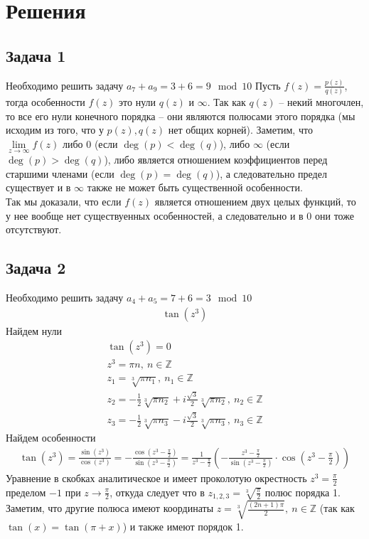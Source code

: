 
\newpage
\section*{Решения}
\subsection*{Задача 1}
	Необходимо решить задачу $a_7 + a_9 = 3 + 6 = 9 \mod 10$
	Пусть $f(z) = \frac{p(z)}{q(z)}$, тогда особенности $f(z)$ это нули $q(z)$ и $\infty$. Так как $q(z)$ -- некий многочлен, то все его нули конечного порядка -- они являются полюсами этого порядка (мы исходим из того, что у $p(z), q(z)$ нет общих корней). Заметим, что $\lim\limits_{z \to \infty} f(z)$ либо $0$ (если $\deg(p) < \deg(q)$), либо $\infty$ (если $\deg(p) > \deg(q)$), либо является отношением коэффициентов перед старшими членами (если $\deg(p) = \deg(q)$), а следовательно предел существует и в $\infty$ также не может быть существенной особенности.\\
	Так мы доказали, что если $f(z)$ является отношением двух целых функций, то у нее вообще нет существуенных особенностей, а следовательно и в 0 они тоже отсутствуют. 
\vskip 0.4in

\subsection*{Задача 2}
	Необходимо решить задачу $a_4 + a_5 = 7 + 6 = 3 \mod 10$
	\begin{gather*}
		\tan(z^3)
	\end{gather*}
	Найдем нули
	\begin{gather*}
		\tan(z^3) = 0\\
		z^3 = \pi n,\ n \in \mathbb{Z}\\
		z_1 = \sqrt[3]{\pi n_1},\ n_1 \in \mathbb{Z}\\
		z_2 = -\frac{1}{2}\sqrt[3]{\pi n_2} + i \frac{\sqrt{3}}{2} \sqrt[3]{\pi n_2},\ n_2 \in \mathbb{Z}\\
		z_3 = -\frac{1}{2}\sqrt[3]{\pi n_3} - i \frac{\sqrt{3}}{2} \sqrt[3]{\pi n_3},\ n_3 \in \mathbb{Z}
	\end{gather*}
	Найдем особенности
	\begin{gather*}
		\tan(z^3)
		= \frac{\sin(z^3)}{\cos(z^3)}
		= - \frac{\cos(z^3 - \frac{\pi}{2})}{\sin(z^3 - \frac{\pi}{2})}
		= \frac{1}{z^3 - \frac{\pi}{2}} \left(-\frac{z^3 - \frac{\pi}{2}}{\sin(z^3 - \frac{\pi}{2})} \cdot \cos(z^3 - \frac{\pi}{2}) \right)
	\end{gather*}
	Уравнение в скобках аналитическое и имеет проколотую окрестность $z^3 = \frac{\pi}{2}$  пределом $-1$ при $z \to \frac{\pi}{2}$, откуда следует что в $z_{1,2,3} = \sqrt[3]{\frac{\pi}{2}}$ полюс порядка 1. Заметим, что другие полюса имеют координаты $z = \sqrt[3]{\frac{(2n+1)\pi}{2}},\ n \in \mathbb{Z}$ (так как $\tan(x) = \tan(\pi + x)$) и также имеют порядок 1.
\vskip 0.4in

